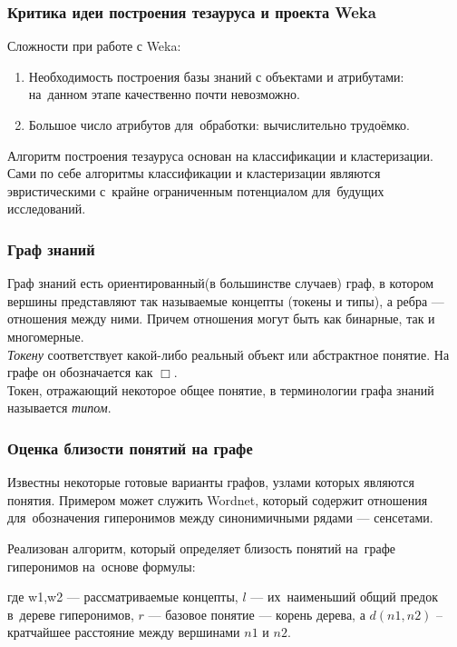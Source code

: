 \documentclass{beamer}
\begin{document}
\begin{frame}
\frametitle{Критика идеи построения тезауруса и проекта Weka}

Сложности при работе с Weka:
\begin{enumerate}
\item{Необходимость построения базы знаний  с объектами и атрибутами: на~данном этапе качественно почти невозможно.}
\item{Большое число атрибутов для~обработки: вычислительно трудоёмко.}
\end{enumerate}

Алгоритм построения тезауруса основан на классификации и кластеризации.
Сами по себе алгоритмы классификации и кластеризации являются эвристическими с~крайне ограниченным потенциалом для~будущих исследований.

\end{frame}

\begin{frame}
\frametitle{Граф знаний}
Граф знаний есть ориентированный(в большинстве случаев) граф, в котором вершины представляют так называемые концепты (токены и типы),
а ребра --- отношения между ними.
Причем отношения могут быть как бинарные, так и многомерные.\\ 

\textsl{Токену} соответствует какой-либо реальный объект или абстрактное понятие.
 На графе он обозначается как $\Box$. \\

Токен, отражающий некоторое общее понятие, в терминологии графа знаний называется \textsl{типом}.\\
\end{frame}

\begin{frame}
\frametitle{Оценка близости понятий на графе}

Известны некоторые готовые варианты графов, узлами которых являются понятия.
Примером может служить Wordnet, который содержит отношения для~обозначения гиперонимов 
между синонимичными рядами --- сенсетами.

Реализован алгоритм, который определяет близость понятий на~графе гиперонимов на~основе формулы:


где w1,w2 --- рассматриваемые концепты, 
$l$ --- их~наименьший общий предок в~дереве гиперонимов,
$r$ --- базовое понятие --- корень дерева, 
а $d(n1,n2)$ -- 
кратчайшее расстояние между вершинами $n1$ и $n2$.

\end{frame}
\end{document}
